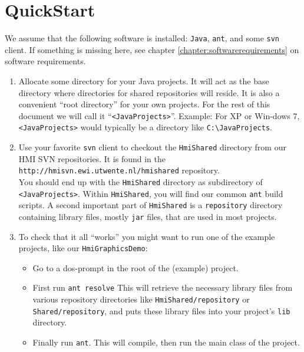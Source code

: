 \chapter{QuickStart}\label{chapter:quickstart}

We assume that the following software is installed: \verb"Java", \verb"ant", and some \verb"svn" client.
If something is missing here, see  chapter \ref{chapter:softwarerequirements} on software requirements.
\begin{enumerate}
\item Allocate some directory for your Java projects. It will act as the base directory where
 directories for shared repositories will reside. It is also a convenient ``root directory'' for your own projects.
For the rest of this document we will call it ``\verb"<JavaProjects>"''.
Example: For XP or Win-dows 7, \verb"<JavaProjects>" would typically be a directory like  \verb"C:\JavaProjects".
\item Use your favorite \verb"svn" client to checkout the \verb"HmiShared" directory from our HMI SVN repositories.
It is found in the
\verb"http://hmisvn.ewi.utwente.nl/hmishared" repository.\\
You should end up with the \verb"HmiShared" directory as subdirectory of \verb"<JavaProjects>".
Within \verb"HmiShared", you will find our common \verb"ant" build scripts. A second important part of \verb"HmiShared" is a
\verb"repository" directory containing library files, mostly \verb"jar" files, that are used in most projects.

\item To check that it all ``works'' you might want to run one of the example projects, like our  \verb"HmiGraphicsDemo":
\begin{itemize}
\item Go to a dos-prompt in the root of the (example) project.
\item     First run \verb"ant resolve" This will retrieve the necessary library files
from various repository directories like \verb"HmiShared/repository" or \verb"Shared/repository",
and puts these library files into your project's \verb"lib" directory.

\item     Finally run  \verb"ant". This will compile, then  run the main class of the project.
\end{itemize}



\end{enumerate}
